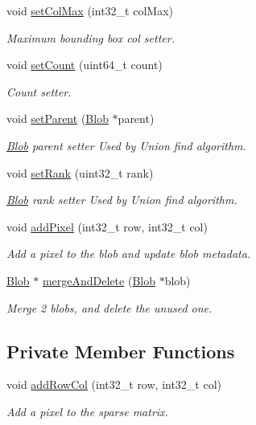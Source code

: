 \begin{DoxyCompactItemize}
void \hyperlink{classfc_1_1Blob_a0534b6d033d5dc27f24f7f7776b148c0}{set\+Col\+Max} (int32\+\_\+t col\+Max)
\begin{DoxyCompactList}\small\item\em Maximum bounding box col setter. \end{DoxyCompactList}\item 
void \hyperlink{classfc_1_1Blob_a4f404eafaf95bd017eecfbd234eb650e}{set\+Count} (uint64\+\_\+t count)
\begin{DoxyCompactList}\small\item\em Count setter. \end{DoxyCompactList}\item 
void \hyperlink{classfc_1_1Blob_a88b9a5ef4d1ea26fd9e313b8d033d721}{set\+Parent} (\hyperlink{classfc_1_1Blob}{Blob} $\ast$parent)
\begin{DoxyCompactList}\small\item\em \hyperlink{classfc_1_1Blob}{Blob} parent setter Used by Union find algorithm. \end{DoxyCompactList}\item 
void \hyperlink{classfc_1_1Blob_a21fdbcaf66775d27bb7680402fe2fd8a}{set\+Rank} (uint32\+\_\+t rank)
\begin{DoxyCompactList}\small\item\em \hyperlink{classfc_1_1Blob}{Blob} rank setter Used by Union find algorithm. \end{DoxyCompactList}\item 
void \hyperlink{classfc_1_1Blob_a01be7313665ad198c73220165a008f2b}{add\+Pixel} (int32\+\_\+t row, int32\+\_\+t col)
\begin{DoxyCompactList}\small\item\em Add a pixel to the blob and update blob metadata. \end{DoxyCompactList}\item 
\hyperlink{classfc_1_1Blob}{Blob} $\ast$ \hyperlink{classfc_1_1Blob_ae84692d9e132dd046b56bb6ac06dd8bb}{merge\+And\+Delete} (\hyperlink{classfc_1_1Blob}{Blob} $\ast$blob)
\begin{DoxyCompactList}\small\item\em Merge 2 blobs, and delete the unused one. \end{DoxyCompactList}\end{DoxyCompactItemize}
\subsection*{Private Member Functions}
\begin{DoxyCompactItemize}
\item 
void \hyperlink{classfc_1_1Blob_a4c9d015ad9326b4f5688af7ae190e613}{add\+Row\+Col} (int32\+\_\+t row, int32\+\_\+t col)
\begin{DoxyCompactList}\small\item\em Add a pixel to the sparse matrix. \end{DoxyCompactList}\end{DoxyCompactItemize}

